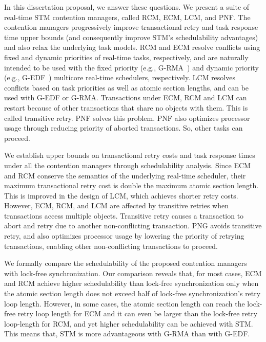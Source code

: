 \documentclass[12pt,english]{report}
\begin{document}
In this dissertation proposal, we answer these questions. We present a suite of real-time STM contention managers, called RCM, ECM, LCM, and PNF. The contention managers progressively improve transactional retry and task response time upper  bounds (and consequently improve STM's schedulability advantages) and also relax the underlying task models. RCM and ECM resolve conflicts using fixed and dynamic priorities of real-time tasks, respectively, and are naturally intended to be used with the fixed priority (e.g., G-RMA~\cite{buttazzo2005hard}) and dynamic priority (e.g., G-EDF~\cite{buttazzo2005hard}) multicore real-time schedulers, respectively. LCM resolves conflicts based on task priorities as well as atomic section lengths, and can be used with G-EDF or G-RMA. Transactions under ECM, RCM and LCM can restart because of other transactions that share no objects with them. This is called transitive retry. PNF solves this problem. PNF also optimizes processor usage through reducing priority of aborted transactions. So, other tasks can proceed.

We establish upper bounds on transactional retry costs and task response times under all the contention managers through schedulability analysis.   Since ECM and RCM conserve the semantics of the underlying real-time scheduler, their maximum transactional retry cost is double the maximum atomic section length. This is improved in the design of LCM, which achieves  shorter retry costs.  However, ECM, RCM, and LCM are affected by transitive retries when transactions access multiple objects. 
Transitive retry causes a transaction to abort and retry due to another non-conflicting transaction. PNG avoids transitive retry, and also optimizes processor usage by lowering the priority of retrying transactions, enabling other non-conflicting transactions to proceed. 

We formally compare the schedulability of the proposed contention managers with lock-free synchronization. 
Our comparison reveals that, for most cases, ECM and RCM achieve higher schedulability than lock-free synchronization only when the atomic section length does not exceed half of lock-free synchronization's retry loop length. However, in some cases, the atomic section length can reach the lock-free retry loop length for ECM and it can even be larger than the lock-free retry loop-length for RCM, and yet higher schedulability can be achieved with STM. This means that, STM is more advantageous with G-RMA than with G-EDF. 
\end{document}
